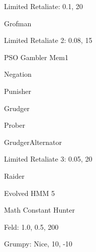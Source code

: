 \item Limited Retaliate: 0.1, 20
\item Grofman
\item Limited Retaliate 2: 0.08, 15
\item PSO Gambler Mem1
\item Negation
\item Punisher
\item Grudger
\item Prober
\item GrudgerAlternator
\item Limited Retaliate 3: 0.05, 20
\item Raider
\item Evolved HMM 5
\item Math Constant Hunter
\item Feld: 1.0, 0.5, 200
\item Grumpy: Nice, 10, -10
